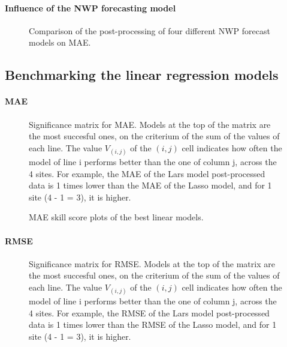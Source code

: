 \paragraph{Influence of the NWP forecasting model}

\begin{figure}[htb!]
    \centering
    
\caption{Comparison of the post-processing of four different NWP forecast models on MAE.}
\end{figure}
\subsection{Benchmarking the linear regression models}

\paragraph{MAE}
\begin{figure}[htb!]
    \centering
    
\caption{Significance matrix for MAE. Models at the top of the matrix are the most succesful ones, on the criterium of the sum of the values of each line. The value $V_{(i,j)}$ of the $(i,j)$ cell indicates how often the model of line i performs better than the one of column j, across the 
4 sites. For example, the MAE of the Lars model post-processed data is 1 times lower than the MAE of the Lasso model, and for 1 site (4 - 1 = 3), it is higher.}
\end{figure}

\begin{figure}[htb!]
    \centering
    
\caption{MAE skill score plots of the best linear models.}
\end{figure}


\paragraph{RMSE}
\begin{figure}[htb!]
    \centering
    
\caption{Significance matrix for RMSE. Models at the top of the matrix are the most succesful ones, on the criterium of the sum of the values of each line. The value $V_{(i,j)}$ of the $(i,j)$ cell indicates how often the model of line i performs better than the one of column j, across the 
4 sites. For example, the RMSE of the Lars model post-processed data is 1 times lower than the RMSE of the Lasso model, and for 1 site (4 - 1 = 3), it is higher.}
\end{figure}

